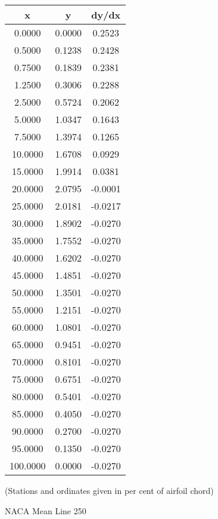 \documentclass[11pt]{book}
\begin{document}
 \vspace{8mm}
 \begin{tabular}{|c|c|c|}  \hline
 x & y & dy/dx \\
 \hline
0.0000 & 0.0000 & 0.2523 \\
0.5000 & 0.1238 & 0.2428 \\
0.7500 & 0.1839 & 0.2381 \\
1.2500 & 0.3006 & 0.2288 \\
2.5000 & 0.5724 & 0.2062 \\
5.0000 & 1.0347 & 0.1643 \\
7.5000 & 1.3974 & 0.1265 \\
10.0000 & 1.6708 & 0.0929 \\
15.0000 & 1.9914 & 0.0381 \\
20.0000 & 2.0795 & -0.0001 \\
25.0000 & 2.0181 & -0.0217 \\
30.0000 & 1.8902 & -0.0270 \\
35.0000 & 1.7552 & -0.0270 \\
40.0000 & 1.6202 & -0.0270 \\
45.0000 & 1.4851 & -0.0270 \\
50.0000 & 1.3501 & -0.0270 \\
55.0000 & 1.2151 & -0.0270 \\
60.0000 & 1.0801 & -0.0270 \\
65.0000 & 0.9451 & -0.0270 \\
70.0000 & 0.8101 & -0.0270 \\
75.0000 & 0.6751 & -0.0270 \\
80.0000 & 0.5401 & -0.0270 \\
85.0000 & 0.4050 & -0.0270 \\
90.0000 & 0.2700 & -0.0270 \\
95.0000 & 0.1350 & -0.0270 \\
100.0000 & 0.0000 & -0.0270 \\
 \hline
 \end{tabular}
 \vspace{8mm}

(Stations and ordinates given in per cent of airfoil chord)

 \newpage
 \label{ml250}
 \begin{Large}
 NACA Mean Line 250
 \end{Large}
  
\end{document}
